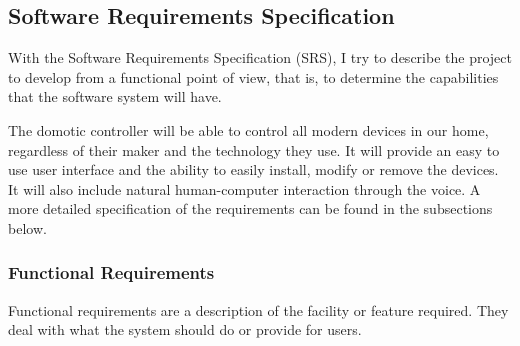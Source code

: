 \subsection{Software Requirements Specification}
With the Software Requirements Specification (SRS), I try to describe the project to develop from a functional point of view, that is,
to determine the capabilities that the software system will have.

The domotic controller will be able to control all modern devices in our home, regardless of their maker and the technology they use.
It will provide an easy to use user interface and the ability to easily install, modify or remove the devices. It will also include natural
human-computer interaction through the voice. A more detailed specification of the requirements can be found in the subsections
below.

\subsubsection{Functional Requirements}
Functional requirements are a description of the facility or feature required. They deal with what the system should do or provide
for users.\cite{sqaFunctionalNonFunctional}

